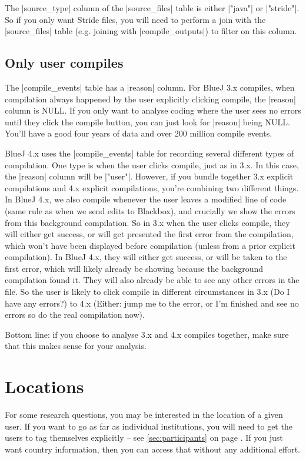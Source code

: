 \documentclass{report}
\newcommand{\myref}[1]{\autoref{#1} on page \pageref*{#1}}
\begin{document}
The |source_type| column of the |source_files| table is either |"java"| or |"stride"|.  So if you only want Stride files, you will need to perform a join with the |source_files| table (e.g. joining with |compile_outputs|) to filter on this column.

\section{Only user compiles}

The |compile_events| table has a |reason| column.  For BlueJ 3.x compiles, when compilation always happened by the user explicitly clicking compile, the |reason| column is NULL.  If you only want to analyse coding where the user sees no errors until they click the compile button, you can just look for |reason| being NULL.  You'll have a good four years of data and over 200 million compile events.

BlueJ 4.x uses the |compile_events| table for recording several different types of compilation.  One type is when the user clicks compile, just as in 3.x.  In this case, the |reason| column will be |"user"|.  However, if you bundle together 3.x explicit compilations and 4.x explicit compilations, you're combining two different things.  In BlueJ 4.x, we also compile whenever the user leaves a modified line of code (same rule as when we send edits to Blackbox), and crucially we show the errors from this background compilation.  So in 3.x when the user clicks compile, they will either get success, or will get presented the first error from the compilation, which won't have been displayed before compilation (unless from a prior explicit compilation).  In BlueJ 4.x, they will either get success, or will be taken to the first error, which will likely already be showing because the background compilation found it.  They will also already be able to see any other errors in the file.  So the user is likely to click compile in different circumstances in 3.x (Do I have any errors?) to 4.x (Either: jump me to the error, or I'm finished and see no errors so do the real compilation now).

Bottom line: if you choose to analyse 3.x and 4.x compiles together, make sure that
 this makes sense for your analysis.

\chapter{Locations}
\label{sec:locations}

For some research questions, you may be interested in the location of a given user.
If you want to go as far as individual institutions, you will need to get the users
to tag themselves explicitly -- see \myref{sec:participants}.  If you just want country
information, then you can access that without any additional effort.
\end{document}
